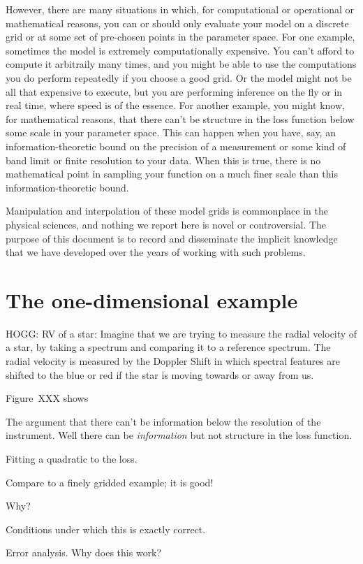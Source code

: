 \documentclass[12pt]{article}
\begin{document}
However, there are many situations in which, for computational or
operational or mathematical reasons, you can or should only evaluate
your model on a discrete grid or at some set of pre-chosen points in
the parameter space.
For one example, sometimes the model is extremely computationally
expensive.
You can't afford to compute it arbitraily many times, and you might be
able to use the computations you do perform repeatedly if you choose a
good grid.
Or the model might not be all that expensive to execute, but you are
performing inference on the fly or in real time, where speed is of the
essence.
For another example, you might know, for mathematical reasons, that
there can't be structure in the loss function below some scale in your
parameter space.
This can happen when you have, say, an information-theoretic bound on
the precision of a measurement or some kind of band limit or finite
resolution to your data.
When this is true, there is no mathematical point in sampling your
function on a much finer scale than this information-theoretic bound.

Manipulation and interpolation of these model grids is commonplace in
the physical sciences, and nothing we report here is novel or
controversial.
The purpose of this document is to record and disseminate the implicit
knowledge that we have developed over the years of working with such
problems.

\section{The one-dimensional example}

HOGG: RV of a star: 
Imagine that we are trying to measure the radial velocity of a star,
by taking a spectrum and comparing it to a reference spectrum.
The radial velocity is measured by the Doppler Shift in which spectral
features are shifted to the blue or red if the star is moving towards
or away from us.

Figure~XXX shows 

The argument that there can't be information below the resolution of
the instrument. Well there can be \emph{information} but not structure
in the loss function.

Fitting a quadratic to the loss.

Compare to a finely gridded example; it is good!

Why?

Conditions under which this is exactly correct.

Error analysis. Why does this work?
\end{document}
